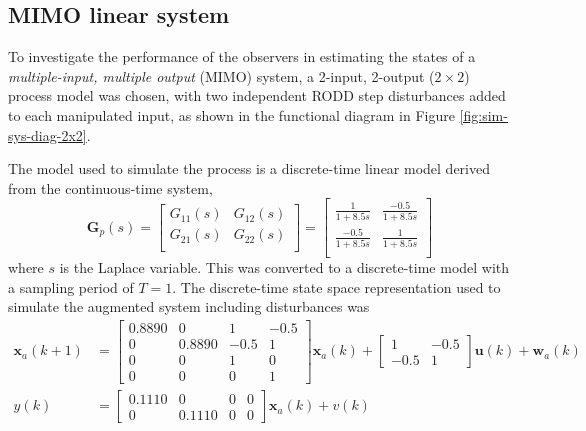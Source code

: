 \subsection{MIMO linear system} \label{sim-obs-lin-2}

To investigate the performance of the observers in estimating the states of a \textit{multiple-input, multiple output} (MIMO) system, a 2-input, 2-output ($2\times2$) process model was chosen, with two independent \gls{RODD} step disturbances added to each manipulated input, as shown in the functional diagram in Figure \ref{fig:sim-sys-diag-2x2}. 

The model used to simulate the process is a discrete-time linear model derived from the continuous-time system,
\begin{equation} \label{eq:sim-sys-siso--ct}
	\mathbf{G}_p(s) = \left[\begin{array}{cc}
		G_{11}(s) & G_{12}(s)  \\
		G_{21}(s) & G_{22}(s)  \\
	\end{array}\right] = \left[\begin{array}{cc}
		\frac{1}{1+8.5s} & \frac{-0.5}{1+8.5s}  \\
		\frac{-0.5}{1+8.5s} & \frac{1}{1+8.5s}  \\
	\end{array}\right]
\end{equation}
where $s$ is the Laplace variable.  This was converted to a discrete-time model with a sampling period of $T=1$. The discrete-time state space representation used to simulate the augmented system including disturbances was
\begin{equation} \label{eq:sim-sys-2x2-ss-aug}
	\begin{split}
		\mathbf{x}_{a}(k+1) & =\left[\begin{array}{cccc}
			0.8890 & 0 & 1 & -0.5 \\
			0 & 0.8890 & -0.5 & 1 \\
			0 & 0 & 1 & 0 \\
			0 & 0 & 0 & 1
		\end{array}\right] \mathbf{x}_{a}(k) + \left[\begin{array}{cc}
			1 & -0.5 \\
			-0.5 & 1
		\end{array}\right] \mathbf{u}(k) + \mathbf{w}_{a}(k) \\
		y(k) & =\left[\begin{array}{cccc}
			0.1110 & 0 & 0 & 0 \\
			0 & 0.1110 & 0 & 0
		\end{array}\right] \mathbf{x}_{a}(k) + v(k)
	\end{split}
\end{equation}
